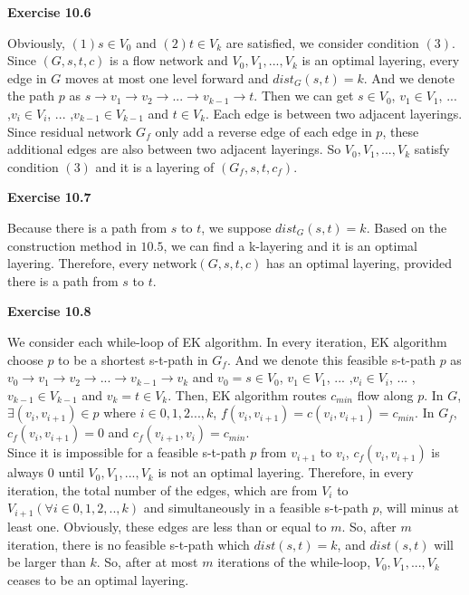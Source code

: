 \documentclass{article} %
\begin{document}
	
	\textbf{Exercise 10.6}\par
	Obviously, $(1)s\in V_{0}$ and $(2)t\in V_{k}$ are satisfied, we consider condition $(3)$. Since $(G,s,t,c)$ is a flow network 
	and $V_{0},V_{1},...,V_{k}$ is an optimal layering, every edge in $G$ moves at most one level forward and $dist_G(s,t)=k$. And we denote the path $p$ 
	as $s\rightarrow v_{1}\rightarrow v_{2} \rightarrow ...\rightarrow v_{k-1} \rightarrow t $. Then we can get  $s\in V_{0}$, $v_{1}\in V_{1}$, ... ,$v_{i}\in V_{i}$, ... ,$v_{k-1}\in V_{k-1}$ and $t\in V_{k}$. Each edge is between two adjacent layerings. Since residual network $G_{f}$ only add a reverse edge of each edge in $p$, these additional edges are also between two adjacent layerings. So $V_{0},V_{1},...,V_{k}$ satisfy condition $(3)$ and it is a layering of $(G_{f},s,t,c_{f})$.\par

    \textbf{Exercise 10.7}\par
    Because there is a path from $s$ to $t$, we suppose $dist_G(s,t)=k$. Based on the construction method in $10.5$, we can find a k-layering and it is an optimal layering. Therefore, every network$(G,s,t,c)$ has an optimal layering, provided there is a path from $s$ to $t$.
	
	\textbf{Exercise 10.8}\par
	We consider each while-loop of EK algorithm. In every iteration, EK algorithm choose $p$ to be a shortest s-t-path in $G_{f}$. 
	And we denote this feasible s-t-path $p$ as $v_{0}\rightarrow v_{1}\rightarrow v_{2} \rightarrow ...\rightarrow v_{k-1} \rightarrow v_{k} $ and $v_{0}=s\in V_{0}$, $v_{1}\in V_{1}$, ... ,$v_{i}\in V_{i}$, ... ,$v_{k-1}\in V_{k-1}$ and $v_{k}=t\in V_{k}$. Then, EK algorithm routes $c_{min}$ flow along $p$. In $G$, $\exists (v_{i},v_{i+1})\in p$ where $i\in {0,1,2...,k}$, $f(v_{i},v_{i+1})=c(v_{i},v_{i+1})=c_{min}$. In $G_{f}$, $c_{f}(v_{i},v_{i+1})=0$ and  $c_{f}(v_{i+1},v_{i})=c_{min}$. \\
	Since it is impossible for a feasible s-t-path $p$ from $v_{i+1}$ to $v_{i}$, $c_{f}(v_{i},v_{i+1})$ is always $0$ until $V_{0},V_{1},...,V_{k}$ is not an optimal layering. Therefore, in every iteration, the total number of the edges, which are from $V_{i}$ to $V_{i+1} (\forall i \in{0,1,2,..,k})$ and simultaneously in a feasible s-t-path $p$, will minus at least one. Obviously, these edges are less than or equal to $m$. So, after $m$ iteration, there is no feasible s-t-path which $dist(s,t)=k$, and $dist(s,t)$ will be larger than $k$. So, after at most $m$ iterations of  the while-loop, $V_{0},V_{1},...,V_{k}$ ceases to be an optimal layering.\par
	
\end{document}
